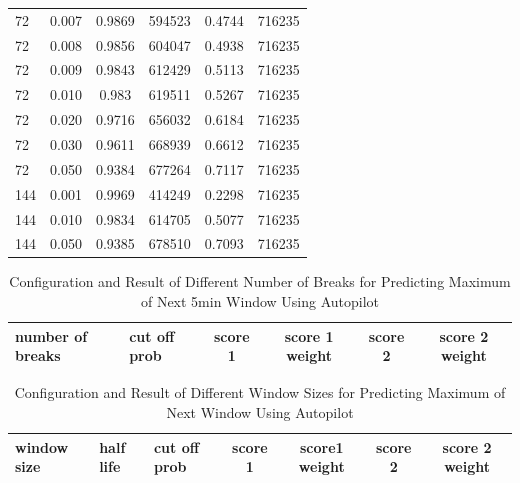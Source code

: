 \documentclass{article}
\begin{document}
\begin{longtable}[htbp]{l|l|*{4}{c}}
  72 & 0.007 & 0.9869 & 594523 & 0.4744 & 716235\\
  72 & 0.008 & 0.9856 & 604047 & 0.4938 & 716235\\
  72 & 0.009 & 0.9843 & 612429 & 0.5113 & 716235\\
  72 & 0.010 & 0.983 & 619511 & 0.5267 & 716235\\
  72 & 0.020 & 0.9716 & 656032 & 0.6184 & 716235\\
  72 & 0.030 & 0.9611 & 668939 & 0.6612 & 716235\\
  72 & 0.050 & 0.9384 & 677264 & 0.7117 & 716235\\
  144 & 0.001 & 0.9969 & 414249 & 0.2298 & 716235\\
  144 & 0.010 & 0.9834 & 614705 & 0.5077 & 716235\\
  144 & 0.050 & 0.9385 & 678510 & 0.7093 & 716235\\
\end{longtable}

\begin{longtable}[htbp]{l|l|*{4}{c}}
  \caption{Configuration and Result of Different Number of Breaks for Predicting Maximum of Next 5min Window Using Autopilot}
  \label{tab:tab1.11.3} \\
  \textbf{number of breaks} & \textbf{cut off
  prob} & \textbf{score 1} & \textbf{score 1 weight} & \textbf{score 2} &
  \textbf{score 2 weight} \\ 
  \hline
\end{longtable}

\begin{longtable}[htbp]{l|l|l|*{4}{c}}
  \caption{Configuration and Result of Different Window Sizes for Predicting Maximum of Next Window Using Autopilot}
  \label{tab:tab1.11.4}\\
  \textbf{window size} & \textbf{half life} &
  \textbf{cut off prob} & \textbf{score 1} & \textbf{score1 weight} &
  \textbf{score 2} & \textbf{score 2 weight} \\
  \hline
\end{longtable}
\end{document}
